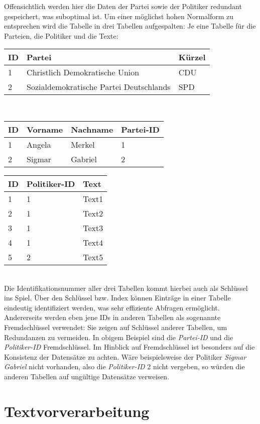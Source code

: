 Offensichtlich werden hier die Daten der Partei sowie der Politiker redundant gespeichert, was suboptimal ist. Um einer möglichst hohen Normalform zu entsprechen wird die Tabelle in drei Tabellen aufgespalten: Je eine Tabelle für die Parteien, die Politiker und die Texte: \\
\begin{tabular}{lll}
\hline
ID & Partei & Kürzel \\
\hline
1 & Christlich Demokratische Union & CDU \\
2 & Sozialdemokratische Partei Deutschlands & SPD \\
\hline
\end{tabular}
\\
\begin{tabular}{llll}
\hline
ID & Vorname & Nachname & Partei-ID\\
\hline
1 & Angela & Merkel & 1\\
2 & Sigmar & Gabriel & 2\\
\hline
\end{tabular}
\begin{tabular}{lll}
\hline
ID & Politiker-ID & Text \\
\hline
1 & 1 & Text1 \\
2 & 1 & Text2 \\
3 & 1 & Text3 \\
4 & 1 & Text4 \\
5 & 2 & Text5 \\
\hline
\end{tabular}
\\
Die Identifikationsnummer aller drei Tabellen kommt hierbei auch als Schlüssel ins Spiel. Über den Schlüssel bzw. Index können Einträge in einer Tabelle eindeutig identifiziert werden, was sehr effiziente Abfragen ermöglicht. Andererseits werden eben jene IDs in anderen Tabellen als sogenannte Fremdschlüssel verwendet: Sie zeigen auf Schlüssel anderer Tabellen, um Redundanzen zu vermeiden. In obigem Beispiel sind die \textit{Partei-ID} und die \textit{Politiker-ID} Fremdschlüssel. Im Hinblick auf Fremdschlüssel ist besonders auf die Konsistenz der Datensätze zu achten. Wäre beispielsweise der Politiker \textit{Sigmar Gabriel} nicht vorhanden, also die \textit{Politiker-ID} 2 nicht vergeben, so würden die anderen Tabellen auf ungültige Datensätze verweisen.

\section{Textvorverarbeitung}

